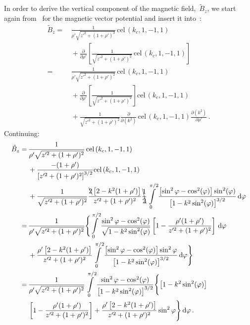 In order to derive the vertical component of the magnetic field,~$\tilde{B}_z$,
we start again from~ for the magnetic vector potential
and insert it into~:
\begin{align}
 \tilde{B}_z
 =&\,   \frac{1}{\rho' \sqrt{z'^2 + (1 + \rho')^2}} \,\textrm{cel}\,(k_c, 1, -1, 1) \nonumber \\
 ~&\, + \frac{\partial}{\partial \rho'} \left[ \frac{1}{\sqrt{z'^2 + (1 + \rho')^2}} \,\textrm{cel}\,(k_c, 1, -1, 1) \right] \nonumber \\
 =&\,   \frac{1}{\rho' \sqrt{z'^2 + (1 + \rho')^2}} \,\textrm{cel}\,(k_c, 1, -1, 1) \nonumber \\
 ~&\, + \frac{\partial}{\partial \rho'} \left[ \frac{1}{\sqrt{z'^2 + (1 + \rho')^2}} \right] \textrm{cel}\,(k_c, 1, -1, 1) \nonumber \\
 ~&\, + \frac{1}{\sqrt{z'^2 + (1 + \rho')^2}} \frac{\partial}{\partial (k^2)} \,\textrm{cel}\,(k_c, 1, -1, 1) \frac{\partial (k^2)}{\partial \rho'} \, .
\end{align}
Continuing:
\begin{align}
 \tilde{B}_z
 =&\,   \frac{1}{\rho' \sqrt{z'^2 + (1 + \rho')^2}} \,\textrm{cel}\,(k_c, 1, -1, 1) \nonumber \\
 ~&\, + \frac{-(1 + \rho')}{\left[z'^2 + (1 + \rho')^2\right]^{3/2}} \textrm{cel}\,(k_c, 1, -1, 1) \nonumber \\
 ~&\, + \frac{1}{\sqrt{z'^2 + (1 + \rho')^2}}
          \frac{\bcancel{2} \left[2 - k^2(1+\rho')\right]}{z'^2 + (1 + \rho')^2}
          \bcancel{\frac{1}{2}} \int\limits_0^{\pi/2} \frac{\left[\sin^2{\varphi} - \cos^2(\varphi)\right]\sin^2(\varphi)}{\left[1 - k^2 \sin^2(\varphi)\right]^{3/2}} \,\mathrm{d}\varphi \nonumber \\
 =&\, \frac{1}{\rho' \sqrt{z'^2 + (1 + \rho')^2}} \Biggl\{
        \int\limits_0^{\pi/2}
          \frac{\sin^2{\varphi} - \cos^2(\varphi)}{\sqrt{1 - k^2 \sin^2(\varphi)}}
          \left[1 - \frac{\rho'(1 + \rho')}{z'^2 + (1 + \rho')^2} \right] \,\mathrm{d}\varphi \nonumber \\
 ~&\, + \frac{\rho'\left[2 - k^2(1+\rho')\right]}{z'^2 + (1 + \rho')^2}
        \int\limits_0^{\pi/2}
          \frac{\left[\sin^2{\varphi} - \cos^2(\varphi)\right]\sin^2{\varphi}}{\left[1 - k^2 \sin^2(\varphi)\right]^{3/2}} \,\mathrm{d}\varphi \Biggr\} \nonumber \\
 =&\, \frac{1}{\rho' \sqrt{z'^2 + (1 + \rho')^2}}
      \int\limits_0^{\pi/2}
        \frac{\sin^2{\varphi} - \cos^2(\varphi)}{\left[1 - k^2 \sin^2(\varphi)\right]^{3/2}} \Biggl\{ \left[1 - k^2 \sin^2(\varphi)\right] \nonumber \\
 ~&\,        \left[1 - \frac{\rho'(1 + \rho')}{z'^2 + (1 + \rho')^2} \right]
          + \frac{\rho'\left[2 - k^2(1+\rho')\right]}{z'^2 + (1 + \rho')^2} \sin^2{\varphi} \Biggr\} \,\mathrm{d}\varphi \, . \label{eqn:cwl_B_z_halfway}
\end{align}
